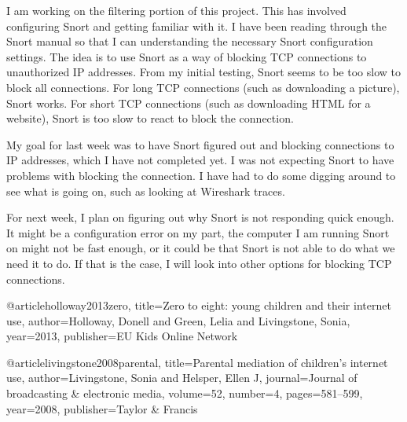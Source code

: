 I am working on the filtering portion of this project. This has involved configuring Snort and getting familiar with it. I have been reading through the Snort manual so that I can understanding the necessary Snort configuration settings. The idea is to use Snort as a way of blocking TCP connections to unauthorized IP addresses. From my initial testing, Snort seems to be too slow to block all connections. For long TCP connections (such as downloading a picture), Snort works. For short TCP connections (such as downloading HTML for a website), Snort is too slow to react to block the connection.

My goal for last week was to have Snort figured out and blocking connections to IP addresses, which I have not completed yet. I was not expecting Snort to have problems with blocking the connection. I have had to do some digging around to see what is going on, such as looking at Wireshark traces.

For next week, I plan on figuring out why Snort is not responding quick enough. It might be a configuration error on my part, the computer I am running Snort on might not be fast enough, or it could be that Snort is not able to do what we need it to do. If that is the case, I will look into other options for blocking TCP connections.


@article{holloway2013zero,
  title={Zero to eight: young children and their internet use},
  author={Holloway, Donell and Green, Lelia and Livingstone, Sonia},
  year={2013},
  publisher={EU Kids Online Network}
}

@article{livingstone2008parental,
  title={Parental mediation of children's internet use},
  author={Livingstone, Sonia and Helsper, Ellen J},
  journal={Journal of broadcasting \& electronic media},
  volume={52},
  number={4},
  pages={581--599},
  year={2008},
  publisher={Taylor \& Francis}
}
